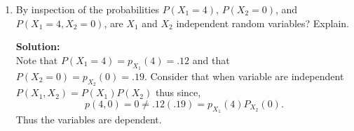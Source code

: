 \documentclass[12pt]{article}
\makeatletter
\theoremstyle{homework}
\newenvironment{exercise}[1]
{\def\@currentlabel{#1}\exercisecore}
{\endexercisecore}
\newcommand{\localhead}[1]{\par\smallskip\noindent\textbf{#1}\nobreak\\}%
\newcommand\solution{\localhead{Solution:}}
\makeatother
\begin{document}
\begin{exercise}{5.4}
\begin{enumerate}
\vspace{.25in}

\item By   inspection   of   the   probabilities   $P(X_1 = 4)$, $P(X_2 = 0)$,  and $P(X_1 = 4, X_2 = 0)$,  are  $X_1$  and  $X_2$ independent random variables? Explain.\\
\solution Note that $P(X_1 = 4) = p_{X_1}(4) = .12$ and that $P(X_2 = 0) = p_{X_2}(0) = .19$. Consider that when variable are independent $P(X_1,X_2) = P(X_1)P(X_2)$ thus since,
\begin{equation*}
  p(4,0) = 0 \neq .12(.19) = p_{X_1}(4)P_{X_2}(0).
\end{equation*}  
Thus the variables are dependent.
\end{enumerate}
\end{exercise}
\vspace{.5in}
\end{document}
